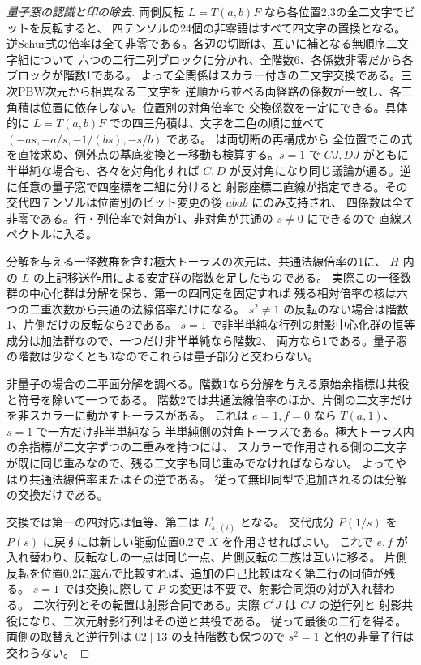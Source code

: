 \begin{proof}[量子窓の認識と印の除去]
両側反転 $L=T(a,b)F$ なら各位置2,3の全二文字でビットを反転すると、
四テンソルの24個の非零語はすべて四文字の置換となる。
逆Schur式の倍率は全て非零である。各辺の切断は、互いに補となる無順序二文字組について
六つの二行二列ブロックに分かれ、全階数6、各係数非零だから各ブロックが階数1である。
よって全関係はスカラー付きの二文字交換である。三次PBW次元から相異なる三文字を
逆順から並べる両経路の係数が一致し、各三角積は位置に依存しない。位置別の対角倍率で
交換係数を一定にできる。具体的に $L=T(a,b)F$ での四三角積は、文字を二色の順に並べて
$(-as,-a/s,-1/(bs),-s/b)$ である。 は両切断の再構成から
全位置でこの式を直接求め、例外点の基底変換と一移動も検算する。$s=1$ で $CJ,DJ$ がともに半単純な場合も、各々を対角化すれば
$C,D$ が反対角になり同じ議論が通る。逆に任意の量子窓で四座標を二組に分けると
射影座標二直線が指定できる。その交代四テンソルは位置別のビット変更の後 $abab$ にのみ支持され、
四係数は全て非零である。行・列倍率で対角が1、非対角が共通の $s\ne0$ にできるので
直線スペクトルに入る。

分解を与える一径数群を含む極大トーラスの次元は、共通法線倍率の1に、
$H$ 内の $L$ の上記移送作用による安定群の階数を足したものである。
実際この一径数群の中心化群は分解を保ち、第一の四同定を固定すれば
残る相対倍率の核は六つの二重次数から共通の法線倍率だけになる。
$s^2\ne1$ の反転のない場合は階数1、片側だけの反転なら2である。
$s=1$ で非半単純な行列の射影中心化群の恒等成分は加法群なので、一つだけ非半単純なら階数2、
両方なら1である。量子窓の階数は少なくとも3なのでこれらは量子部分と交わらない。

非量子の場合の二平面分解を調べる。階数1なら分解を与える原始余指標は共役と符号を除いて一つである。
階数2では共通法線倍率のほか、片側の二文字だけを非スカラーに動かすトーラスがある。
これは $e=1,f=0$ なら $T(a,1)$、$s=1$ で一方だけ非半単純なら
半単純側の対角トーラスである。極大トーラス内の余指標が二文字ずつの二重みを持つには、
スカラーで作用される側の二文字が既に同じ重みなので、残る二文字も同じ重みでなければならない。
よってやはり共通法線倍率またはその逆である。
従って無印同型で追加されるのは分解の交換だけである。

交換では第一の四対応は恒等、第二は $L_{\pi_1(i)}^t$ となる。
交代成分 $P(1/s)$ を $P(s)$ に戻すには新しい能動位置0,2で $X$ を作用させればよい。
これで $e,f$ が入れ替わり、反転なしの一点は同じ一点、片側反転の二族は互いに移る。
片側反転を位置0,2に選んで比較すれば、追加の自己比較はなく第二行の同値が残る。
$s=1$ では交換に際して $P$ の変更は不要で、射影合同類の対が入れ替わる。
二次行列とその転置は射影合同である。実際 $C^t J$ は $CJ$ の逆行列と
射影共役になり、二次元射影行列はその逆と共役である。
従って最後の二行を得る。両側の取替えと逆行列は $02\mid13$ の支持階数も保つので
$s^2=1$ と他の非量子行は交わらない。
\end{proof}
